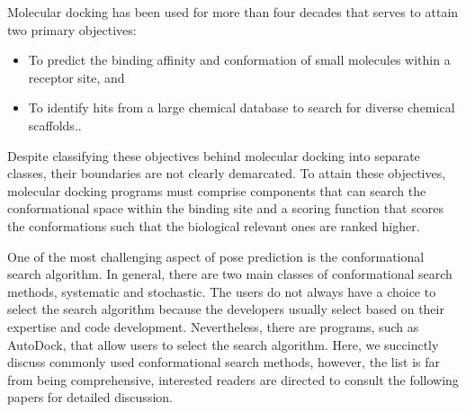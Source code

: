 Molecular docking has been used for more than four decades that serves to attain two primary objectives:
\begin{itemize}
    \item To predict the binding affinity and conformation of small molecules within a receptor site, and 
    \item To identify hits from a large chemical database to search for diverse chemical scaffolds.\cite{bib1}. 
\end{itemize}

Despite classifying these objectives behind molecular docking into separate classes, their boundaries are not clearly demarcated. To attain these objectives, molecular docking programs must comprise components that can search the conformational space within the binding site and a scoring function that scores the conformations such that the biological relevant ones are ranked higher.


%
One of the most challenging aspect of pose prediction is the conformational search algorithm. In general, there are two main classes of conformational search methods, systematic and stochastic.  The users do not always have a choice to select the search algorithm because the developers usually select based on their expertise and code development. Nevertheless, there are programs, such as AutoDock\cite{bib22}, that allow users to select the search algorithm. Here, we succinctly discuss commonly used conformational search methods, however, the list is far from being comprehensive, interested readers are directed to consult the following papers for detailed discussion\cite{bib17, bib23}. 

